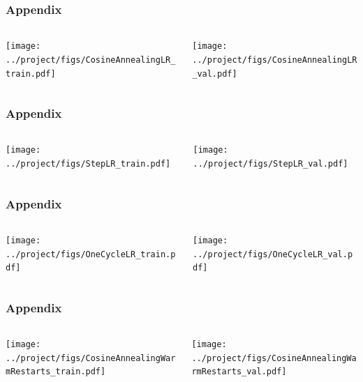 \documentclass[10pt,aspectratio=169]{beamer}
\begin{document}
    \begin{frame}
        \frametitle{Appendix}
        \begin{columns}
            \begin{column}{0.5\textwidth}
                \texttt{[image: ../project/figs/CosineAnnealingLR\_train.pdf]}
            \end{column}
            \begin{column}{0.5\textwidth}
                \texttt{[image: ../project/figs/CosineAnnealingLR\_val.pdf]}
            \end{column}
        \end{columns}
    
    \end{frame}


    \begin{frame}
        \frametitle{Appendix}
        \begin{columns}
            \begin{column}{0.5\textwidth}
                \texttt{[image: ../project/figs/StepLR\_train.pdf]}
            \end{column}
            \begin{column}{0.5\textwidth}
                \texttt{[image: ../project/figs/StepLR\_val.pdf]}
            \end{column}
        \end{columns}
    
    \end{frame}

    \begin{frame}
        \frametitle{Appendix}
        \begin{columns}
            \begin{column}{0.5\textwidth}
                \texttt{[image: ../project/figs/OneCycleLR\_train.pdf]}
            \end{column}
            \begin{column}{0.5\textwidth}
                \texttt{[image: ../project/figs/OneCycleLR\_val.pdf]}
            \end{column}
        \end{columns}
    
    \end{frame}

    \begin{frame}
        \frametitle{Appendix}
        \begin{columns}
            \begin{column}{0.5\textwidth}
                \texttt{[image: ../project/figs/CosineAnnealingWarmRestarts\_train.pdf]}
            \end{column}
            \begin{column}{0.5\textwidth}
                \texttt{[image: ../project/figs/CosineAnnealingWarmRestarts\_val.pdf]}
            \end{column}
        \end{columns}
    
    \end{frame}
\end{document}
